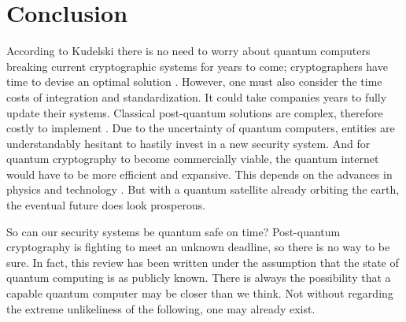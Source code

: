 \section{Conclusion}
According to Kudelski there is no need to worry about quantum computers breaking current cryptographic systems for years to come; cryptographers have time to devise an optimal solution \cite{Impact_QC_Cryptog}. However, one must also consider the time costs of integration and standardization. It could take companies years to fully update their systems. Classical post-quantum solutions are complex, therefore costly to implement \cite{Sec_Risk}. Due to the uncertainty of quantum computers, entities are understandably hesitant to hastily invest in a new security system. And for quantum cryptography to become commercially viable, the quantum internet would have to be more efficient and expansive. This depends on the advances in physics and technology \cite{Q_Cryptog}. But with a quantum satellite already orbiting the earth, the eventual future does look prosperous.

So can our security systems be quantum safe on time? Post-quantum cryptography is fighting to meet an unknown deadline, so there is no way to be sure. In fact, this review has been written under the assumption that the state of quantum computing is as publicly known. There is always the possibility that a capable quantum computer may be closer than we think. Not without regarding the extreme unlikeliness of the following, one may already exist. 